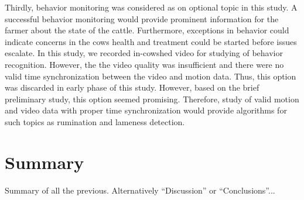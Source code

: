 \documentclass[english,12pt,a4paper,pdftex,elec,utf8]{aaltothesis}
\begin{document}
Thirdly, behavior monitoring was considered as on optional topic in this study. A successful behavior monitoring would provide prominent information for the farmer about the state of the cattle. Furthermore, exceptions in behavior could indicate concerns in the cows health and treatment could be started before issues escalate. In this study, we recorded in-cowshed video for studying of behavior recognition. However, the the video quality was insufficient and there were no valid time synchronization between the video and motion data. Thus, this option was discarded in early phase of this study. However, based on the brief preliminary study, this option seemed promising. Therefore, study of valid motion and video data with proper time synchronization would provide algorithms for such topics as rumination and lameness detection.


\clearpage

\section{Summary} \label{summarysection}


Summary of all the previous. Alternatively ``Discussion'' or ``Conclusions''...


\clearpage

\thesisbibliography

%



\printbibliography




\clearpage

\thesisappendix

%
\end{document}
